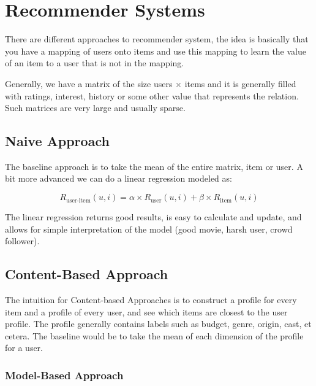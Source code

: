 \section{Recommender Systems}

There are different approaches to recommender system, the idea is
basically that you have a mapping of users onto items and use this
mapping to learn the value of an item to a user that is not in the
mapping.

Generally, we have a matrix of the size users $\times$ items and
it is generally filled with ratings, interest, history or some other
value that represents the relation. Such matrices are very large and
usually sparse.

\subsection{Naive Approach}

The baseline approach is to take the mean of the entire matrix, item or user.
A bit more advanced we can do a linear regression modeled as:

\begin{definition}
  \begin{displaymath}
    R_\text{user-item}(u, i) = \alpha \times R_\text{user}(u, i) +
    \beta \times R_\text{item}(u, i)
  \end{displaymath}
\end{definition}

The linear regression returns good results, is easy to calculate and
update, and allows for simple interpretation of the model (good movie,
harsh user, crowd follower).

\subsection{Content-Based Approach}

The intuition for Content-based Approaches is to construct a profile
for every item and a profile of every user, and see which items are
closest to the user profile. The profile generally contains labels such
as budget, genre, origin, cast, et cetera. The baseline would be to take
the mean of each dimension of the profile for a user.

\subsubsection{Model-Based Approach}

